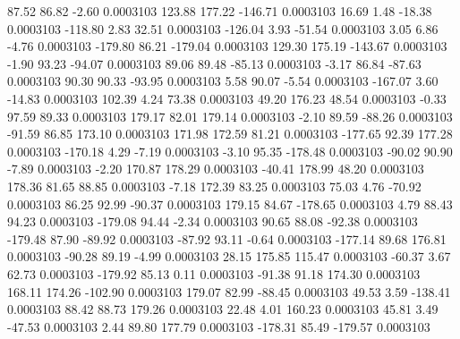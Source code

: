        87.52       86.82       -2.60     0.0003103
      123.88      177.22     -146.71     0.0003103
       16.69        1.48      -18.38     0.0003103
     -118.80        2.83       32.51     0.0003103
     -126.04        3.93      -51.54     0.0003103
        3.05        6.86       -4.76     0.0003103
     -179.80       86.21     -179.04     0.0003103
      129.30      175.19     -143.67     0.0003103
       -1.90       93.23      -94.07     0.0003103
       89.06       89.48      -85.13     0.0003103
       -3.17       86.84      -87.63     0.0003103
       90.30       90.33      -93.95     0.0003103
        5.58       90.07       -5.54     0.0003103
     -167.07        3.60      -14.83     0.0003103
      102.39        4.24       73.38     0.0003103
       49.20      176.23       48.54     0.0003103
       -0.33       97.59       89.33     0.0003103
      179.17       82.01      179.14     0.0003103
       -2.10       89.59      -88.26     0.0003103
      -91.59       86.85      173.10     0.0003103
      171.98      172.59       81.21     0.0003103
     -177.65       92.39      177.28     0.0003103
     -170.18        4.29       -7.19     0.0003103
       -3.10       95.35     -178.48     0.0003103
      -90.02       90.90       -7.89     0.0003103
       -2.20      170.87      178.29     0.0003103
      -40.41      178.99       48.20     0.0003103
      178.36       81.65       88.85     0.0003103
       -7.18      172.39       83.25     0.0003103
       75.03        4.76      -70.92     0.0003103
       86.25       92.99      -90.37     0.0003103
      179.15       84.67     -178.65     0.0003103
        4.79       88.43       94.23     0.0003103
     -179.08       94.44       -2.34     0.0003103
       90.65       88.08      -92.38     0.0003103
     -179.48       87.90      -89.92     0.0003103
      -87.92       93.11       -0.64     0.0003103
     -177.14       89.68      176.81     0.0003103
      -90.28       89.19       -4.99     0.0003103
       28.15      175.85      115.47     0.0003103
      -60.37        3.67       62.73     0.0003103
     -179.92       85.13        0.11     0.0003103
      -91.38       91.18      174.30     0.0003103
      168.11      174.26     -102.90     0.0003103
      179.07       82.99      -88.45     0.0003103
       49.53        3.59     -138.41     0.0003103
       88.42       88.73      179.26     0.0003103
       22.48        4.01      160.23     0.0003103
       45.81        3.49      -47.53     0.0003103
        2.44       89.80      177.79     0.0003103
     -178.31       85.49     -179.57     0.0003103
